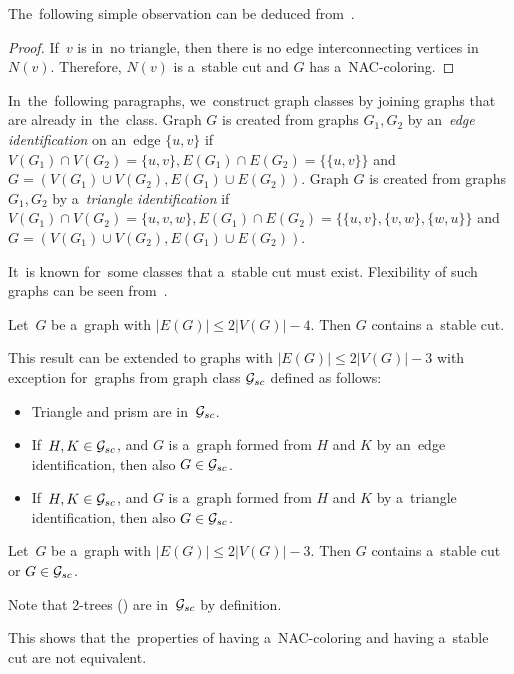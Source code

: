 The~following simple observation can be deduced
from~.
%
%
\begin{proof}
	If~\( v \) is in~no triangle, then there is no edge interconnecting
	vertices in~\( N(v) \). Therefore, \( N(v) \) is a~stable cut and \( G \)
	has a~NAC-coloring.
\end{proof}

In~the~following paragraphs, we~construct graph classes by joining graphs
that are already in~the~class.
Graph \( G \) is created from graphs \( G_1, G_2 \) by an~\emph{edge identification}
on an~edge \( \{u, v\} \)
if~\( V(G_1) \cap V(G_2) = \{u, v\}, E(G_1) \cap E(G_2) = \{\{u, v\}\} \)
and \( G = (V(G_1) \cup V(G_2), E(G_1) \cup E(G_2)) \).
Graph \( G \) is created from graphs \( G_1, G_2 \) by a~\emph{triangle identification}
if~\( V(G_1) \cap V(G_2) = \{u, v, w\}, E(G_1) \cap E(G_2) = \{\{u, v\}, \{v, w\}, \{w, u\}\} \)
and \( G = (V(G_1) \cup V(G_2), E(G_1) \cup E(G_2)) \).

It~is known for~some classes that a~stable cut must exist.
Flexibility of such graphs can be seen from~.
%
\begin{theorem}
	Let~\( G \) be a~graph with \( |E(G)| \le 2|V(G)|-4 \).
	Then \( G \) contains a~stable cut.
\end{theorem}
%
This result can be extended to graphs with \( |E(G)| \le 2|V(G)|-3 \) with exception
for~graphs from graph class \( \mathcal{G}_{sc} \) defined as follows:
%
\begin{itemize}
	\item Triangle and prism are in~\( \mathcal{G}_{sc} \).
	\item If~\( H, K \in \mathcal{G}_{sc} \), and \( G \) is a~graph
	      formed from \( H \) and \( K \) by an~edge identification,
	      then also \( G \in \mathcal{G}_{sc} \).
	\item If~\( H, K \in \mathcal{G}_{sc} \), and \( G \) is a~graph
	      formed from \( H \) and \( K \) by a~triangle identification,
	      then also \( G \in \mathcal{G}_{sc} \).
\end{itemize}
%
%
\begin{theorem}
	Let~\( G \) be a~graph with \( |E(G)| \le 2|V(G)|-3 \). Then \( G \) contains
	a~stable cut or \( G \in \mathcal{G}_{sc} \).
\end{theorem}
%
Note that 2-trees ()
are in~\( \mathcal{G}_{sc} \) by definition.
%
%
This shows that the~properties of having a~NAC-coloring and having a~stable cut
are not equivalent.

